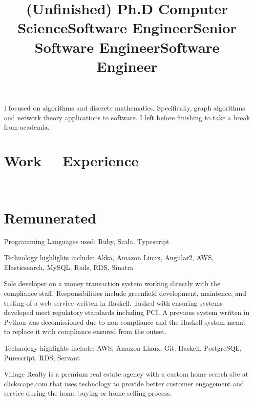 \documentclass[margintitle,line]{res}
\renewcommand{\subsection}[1]{\section{\normalfont #1}}
\begin{document}
\begin{resume}
\title{(Unfinished) Ph.D Computer Science}
\begin{position}
I focused on algorithms and discrete mathematics. Specifically, graph
algorithms and network theory applications to software. I left before
finishing to take a break from academia.
\end{position}

\section{Work \ \ Experience}
\ \\
\subsection{Remunerated}

\title{Software Engineer}
\begin{position}
  Programming Languages used:
  Ruby, Scala, Typescript

  Technology highlights include:
  Akka, Amazon Linux, Angular2, AWS, Elasticsearch, MySQL, Rails, RDS, Sinatra
\end{position}

\title{Senior Software Engineer}
\begin{position}
  Sole developer on a money transaction system working directly with the
  compliance staff. Responsibilities include greenfield
  development, maintence, and testing of a web service written in Haskell. Tasked
  with ensuring systems developed meet regulatory standards including PCI. A
  previous system written in Python was decomissioned due to non-compliance and
  the Haskell system meant to replace it with compliance ensured from the outset.

  Technology highlights include: AWS, Amazon Linux, Git, Haskell, PostgreSQL,
  Purescript, RDS, Servant
\end{position}

\title{Software Engineer}
\begin{position}
  Village Realty is a premium real estate agency with a custom home search site
  at clickscape.com that uses technology to provide better customer engagement
  and service during the home buying or home selling process.


\end{position}
\end{resume}
\end{document}
